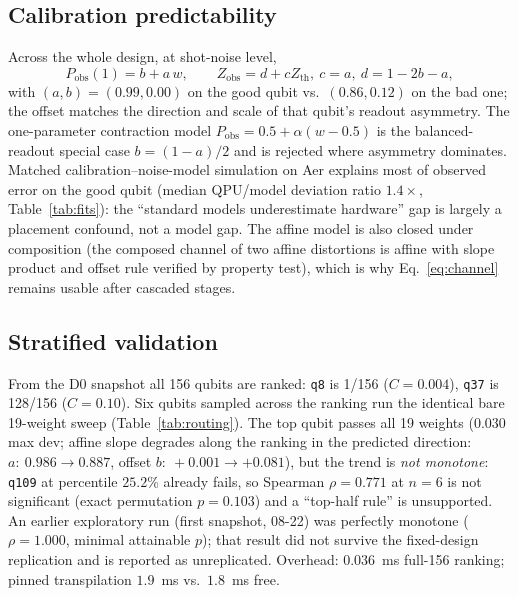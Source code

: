 \documentclass[journal,10pt,twocolumn]{IEEEtran}
\newcommand{\q}[1]{\texttt{q#1}}
\begin{document}
\subsection{Calibration predictability}
Across the whole design, at shot-noise level,
\begin{equation}
P_{\mathrm{obs}}(1)=b+a\,w,\qquad Z_{\mathrm{obs}}=d+cZ_{\mathrm{th}},\ c{=}a,\ d{=}1{-}2b{-}a,
\label{eq:channel}
\end{equation}
with $(a,b){=}(0.99,0.00)$ on the good qubit vs.\ $(0.86,0.12)$ on the bad one; the offset matches the direction
and scale of that qubit's readout asymmetry. The one-parameter contraction model $P_{\mathrm{obs}}=0.5+\alpha(w-0.5)$
is the balanced-readout special case $b{=}(1-a)/2$ and is rejected where asymmetry dominates. Matched
calibration--noise-model simulation on Aer explains most of observed error on the good qubit (median
QPU/model deviation ratio $1.4\times$, Table~\ref{tab:fits}): the ``standard models underestimate hardware'' gap is
largely a placement confound, not a model gap. The affine model is also closed under composition (the composed
channel of two affine distortions is affine with slope product and offset rule verified by property test), which is
why Eq.~\eqref{eq:channel} remains usable after cascaded stages.

\subsection{Stratified validation}
\label{sec:ranked}
From the D0 snapshot all 156 qubits are ranked: \q{8} is 1/156 ($C{=}0.004$), \q{37} is 128/156 ($C{=}0.10$).
Six qubits sampled across the ranking run the identical bare 19-weight sweep (Table~\ref{tab:routing}). The top
qubit passes all 19 weights ($0.030$ max dev; affine slope degrades along the ranking in the predicted direction:
$a{:}\ 0.986{\to}0.887$, offset $b{:}\ +0.001{\to}+0.081$), but the trend is \emph{not monotone}: \q{109} at
percentile $25.2\%$ already fails, so Spearman $\rho{=}0.771$ at $n{=}6$ is not significant (exact permutation
$p{=}0.103$) and a ``top-half rule'' is unsupported. An earlier exploratory run (first snapshot, 08-22) was
perfectly monotone ($\rho{=}1.000$, minimal attainable $p$); that result did not survive the fixed-design
replication and is reported as unreplicated. Overhead: $0.036$~ms full-156 ranking; pinned transpilation $1.9$~ms
vs.\ $1.8$~ms free.
\end{document}
